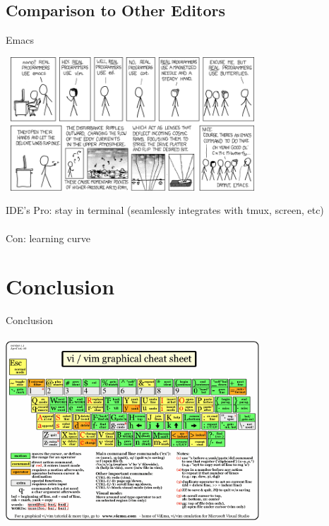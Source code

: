 \documentclass{beamer}
\begin{document}
        \subsection{Comparison to Other Editors}

            \begin{frame}{Emacs}
                \begin{center}
                \includegraphics[width = 9.5cm, height = 5cm]{real_programmers.png}
                \end{center}
            \end{frame}

            \begin{frame}{IDE's}
                Pro: stay in terminal (seamlessly integrates with tmux, screen, etc) \\~\\
                \pause
                Con: learning curve
            \end{frame}

    \section*{Conclusion}

            \begin{frame}{Conclusion}
                \begin{center}
                \includegraphics[width = 9.5cm, height = 7cm]{vi_vim_cheat_sheet.png}
                \end{center}
            \end{frame}
\end{document}
